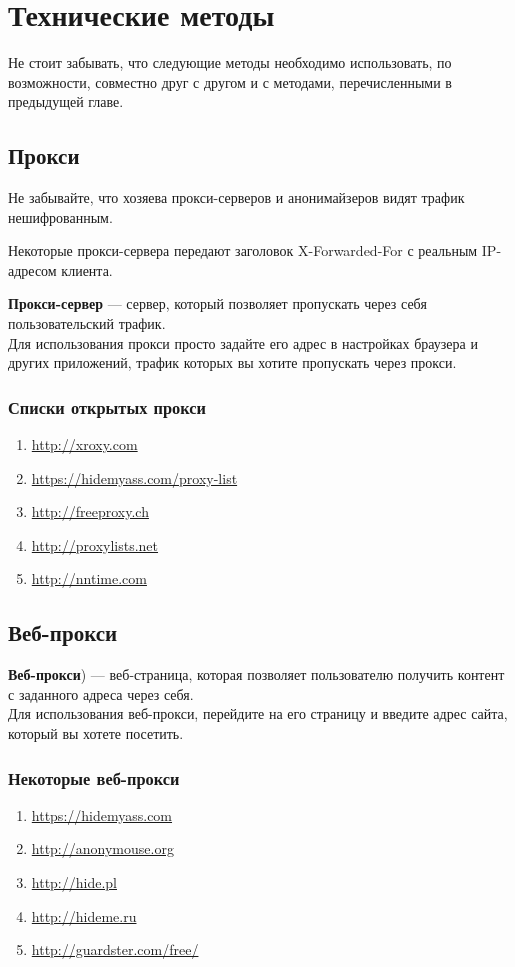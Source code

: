 \chapter{Технические методы}
\begin{important}
Не стоит забывать, что следующие методы необходимо использовать, по возможности, совместно друг с другом и с методами, перечисленными в предыдущей главе.
\end{important}

\section{Прокси}
\begin{important}
Не забывайте, что хозяева прокси-серверов и анонимайзеров видят трафик нешифрованным.
\end{important}
\begin{important}
Некоторые прокси-сервера передают заголовок X-Forwarded-For с реальным IP-адресом клиента.
\end{important}
\textbf{Прокси-сервер} --- сервер, который позволяет пропускать через себя пользовательский трафик.\\
Для использования прокси просто задайте его адрес в настройках браузера и других приложений, трафик которых вы хотите пропускать через прокси.
\subsection{Списки открытых прокси}
\begin{enumerate}
\item \url{http://xroxy.com}
\item \url{https://hidemyass.com/proxy-list}
\item \url{http://freeproxy.ch}
\item \url{http://proxylists.net}
\item \url{http://nntime.com}
\end{enumerate}

\section{Веб-прокси}
\textbf{Веб-прокси}) --- веб-страница, которая позволяет пользователю получить контент с заданного адреса через себя.\\
Для использования веб-прокси, перейдите на его страницу и введите адрес сайта, который вы хотете посетить.
\subsection{Некоторые веб-прокси}
\begin{enumerate}
\item \url{https://hidemyass.com}
\item \url{http://anonymouse.org}
\item \url{http://hide.pl}
\item \url{http://hideme.ru}
\item \url{http://guardster.com/free/}
\end{enumerate}

